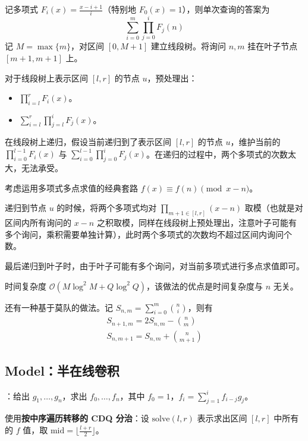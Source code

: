 记多项式 $F_i(x) = \frac{x - i + 1}{i}$（特别地 $F_0(x) = 1$），则单次查询的答案为
\[
\sum_{i = 0}^m\prod_{j = 0}^i F_j(n)
\]
记 $M = \max\{m\}$，对区间 $[0, M + 1]$ 建立线段树。将询问 $n, m$ 挂在叶子节点 $[m + 1, m + 1]$ 上。

对于线段树上表示区间 $[l, r]$ 的节点 $u$，预处理出：

\begin{itemize}
    \item $\prod_{i = l}^r F_i(x)$。
    \item $\sum_{i = l}^r \prod_{j = l}^i F_j(x)$。
\end{itemize}

在线段树上递归，假设当前递归到了表示区间 $[l, r]$ 的节点 $u$，维护当前的 $\prod_{i = 0}^{l - 1} F_i(x)$ 与 $\sum_{i = 0}^{l - 1} \prod_{j = 0}^i F_j(x)$。在递归的过程中，两个多项式的次数太大，无法承受。

考虑运用多项式多点求值的经典套路 $f(x) \equiv f(n) \pmod{x - n}$。

递归到节点 $u$ 的时候，将两个多项式均对 $\prod_{m + 1\in [l, r]} (x - n)$ 取模（也就是对区间内所有询问的 $x - n$ 之积取模，同样在线段树上预处理出，注意叶子可能有多个询问，乘积需要单独计算），此时两个多项式的次数均不超过区间内询问个数。

最后递归到叶子时，由于叶子可能有多个询问，对当前多项式进行多点求值即可。

时间复杂度 $\mathcal{O}(M \log^2 M + Q \log^2 Q)$，该做法的优点是时间复杂度与 $n$ 无关。

\begin{quoteblock}
还有一种基于莫队的做法。记 $S_{n, m} = \sum_{i = 0}^m \binom{n}{i}$，则有
\[
\begin{gathered}
S_{n + 1, m} = 2S_{n, m} - \binom{n}{m} \\
S_{n, m + 1} = S_{n, m} + \binom{n}{m + 1}
\end{gathered}
\]
\end{quoteblock}

\subsection{Model：半在线卷积}

：给出 $g_1, \dots, g_n$，求出 $f_0, \dots, f_n$，其中 $f_0 = 1$，$f_i = \sum_{j = 1}^i f_{i - j}g_j$。

使用\textbf{按中序遍历转移的 CDQ 分治}：设 $\mathrm{solve}(l, r)$ 表示求出区间 $[l, r]$ 中所有的 $f$ 值，取 $\mathrm{mid} = \lfloor \frac{l + r}{2} \rfloor$。

